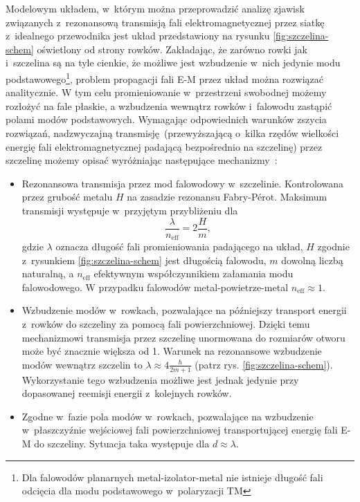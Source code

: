 Modelowym układem, w~którym można przeprowadzić analizę zjawisk związanych z~rezonansową transmisją fali elektromagnetycznej przez siatkę z~idealnego przewodnika jest układ przedstawiony na rysunku \ref{fig:szczelina-schem} oświetlony od strony rowków. Zakładając, że zarówno rowki jak i~szczelina są na tyle cienkie, że możliwe jest wzbudzenie w~nich jedynie modu podstawowego\footnote{Dla falowodów planarnych metal-izolator-metal nie istnieje długość fali odcięcia dla modu podstawowego w~polaryzacji TM}, problem propagacji fali E-M przez układ można rozwiązać analitycznie. W tym celu promieniowanie w~przestrzeni swobodnej możemy rozłożyć na fale płaskie, a wzbudzenia wewnątrz rowków i~falowodu zastąpić polami modów podstawowych. Wymagając odpowiednich warunków zszycia rozwiązań, nadzwyczajną transmisję~(przewyższającą o~kilka rzędów wielkości energię fali elektromagnetycznej padającą bezpośrednio na szczelinę) przez szczelinę możemy opisać wyróżniając następujące mechanizmy~\cite{martin2001theory}:
\begin{itemize}
	\item Rezonansowa transmisja przez mod falowodowy w~szczelinie. Kontrolowana przez grubość metalu $H$ na zasadzie rezonansu Fabry-P\'{e}rot. Maksimum transmisji występuje w~przyjętym przybliżeniu dla
\begin{equation}
\frac{\lambda}{n_{\textrm{eff}}} = 2 \frac {H}{m},
\label{eq:fp-szczelina}
\end{equation}
gdzie $\lambda$ oznacza długość fali promieniowania padającego na układ, $H$ zgodnie z~rysunkiem \ref{fig:szczelina-schem} jest długością falowodu, $m$ dowolną liczbą naturalną, a $n_{\textrm{eff}}$ efektywnym współczynnikiem załamania modu falowodowego. W przypadku falowodów metal-powietrze-metal $n_{\textrm{eff}} \approx 1$.
	\item Wzbudzenie modów w~rowkach, pozwalające na późniejszy transport energii z~rowków do szczeliny za pomocą fali powierzchniowej. Dzięki temu mechanizmowi transmisja przez szczelinę unormowana do rozmiarów otworu może być znacznie większa od 1. Warunek na rezonansowe wzbudzenie modów wewnątrz szczelin to $\lambda \approx 4 \frac {h}{2m+1}$ (patrz rys. \ref{fig:szczelina-schem}). Wykorzystanie tego wzbudzenia możliwe jest jednak jedynie przy dopasowanej reemisji energii z~kolejnych rowków.
	\item Zgodne w~fazie pola modów w~rowkach, pozwalające na wzbudzenie w~płaszczyźnie wejściowej fali powierzchniowej transportującej energię fali E-M do szczeliny. Sytuacja taka występuje dla $d \approx \lambda$.
\end{itemize}

